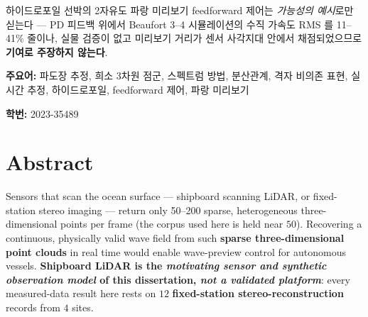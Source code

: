 \documentclass[11pt]{report}
\numberwithin{equation}{chapter}
\numberwithin{figure}{chapter}
\numberwithin{table}{chapter}
\begin{document}
하이드로포일 선박의 2자유도 파랑 미리보기 feedforward 제어는 \emph{가능성의 예시}로만
싣는다 --- PD 피드백 위에서 Beaufort 3--4 시뮬레이션의 수직 가속도 RMS 를 11--41\%
줄이나, 실물 검증이 없고 미리보기 거리가 센서 사각지대 안에서 채점되었으므로
\textbf{기여로 주장하지 않는다}.

\vspace{1em}
\noindent\textbf{주요어:} 파도장 추정, 희소 3차원 점군, 스펙트럼 방법,
분산관계, 격자 비의존 표현, 실시간 추정, 하이드로포일, feedforward 제어,
파랑 미리보기

\noindent\textbf{학번:} 2023-35489

\newpage
\chapter*{Abstract}

Sensors that scan the ocean surface --- shipboard scanning LiDAR, or fixed-station
stereo imaging --- return only 50--200 sparse, heterogeneous three-dimensional points
per frame (the corpus used here is held near $50$). Recovering a continuous, physically
valid wave field from such \textbf{sparse three-dimensional point clouds} in real time
would enable wave-preview control for autonomous vessels. \textbf{Shipboard LiDAR is the
\emph{motivating sensor and synthetic observation model} of this dissertation,
\emph{not a validated platform}}: every measured-data result here rests on $12$
\textbf{fixed-station stereo-reconstruction} records from $4$ sites.
\end{document}
